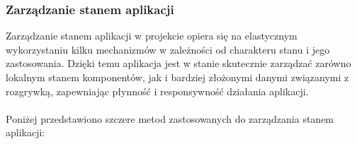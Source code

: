 \documentclass[12pt,a4paper]{article}
\begin{document}
\newpage

\subsubsection{Zarządzanie stanem aplikacji}

\noindent
Zarządzanie stanem aplikacji w projekcie opiera się na elastycznym wykorzystaniu kilku mechanizmów w zależności od charakteru stanu i jego zastosowania. Dzięki temu aplikacja jest w stanie skutecznie zarządzać zarówno lokalnym stanem komponentów, jak i bardziej złożonymi danymi związanymi z rozgrywką, zapewniając płynność i responsywność działania aplikacji.
\\\\
Poniżej przedstawiono szczere metod zastosowanych do zarządzania stanem aplikacji:
\end{document}
